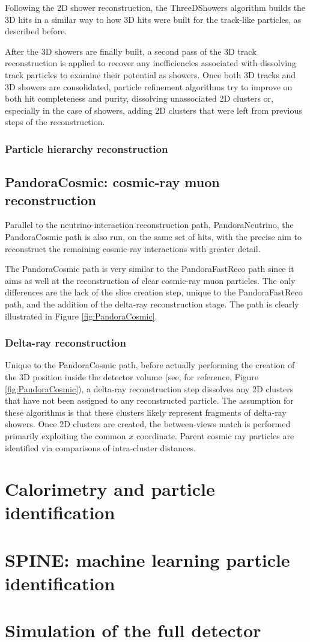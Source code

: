 Following the 2D shower reconstruction, the ThreeDShowers algorithm builds the 3D hits in a similar way to how 3D hits were built for the track-like particles, as described before. 

After the 3D showers are finally built, a second pass of the 3D track reconstruction is applied to recover any inefficiencies associated with dissolving track particles to examine their potential as showers. Once both 3D tracks and 3D showers are consolidated, particle refinement algorithms try to improve on both hit completeness and purity, dissolving unassociated 2D clusters or, especially in the case of showers, adding 2D clusters that were left from previous steps of the reconstruction. 

\subsubsection{Particle hierarchy reconstruction}



\subsection{PandoraCosmic: cosmic-ray muon reconstruction}

Parallel to the neutrino-interaction reconstruction path, PandoraNeutrino, the PandoraCosmic path is also run, on the same set of hits, with the precise aim to reconstruct the remaining cosmic-ray interactions with greater detail. 

The PandoraCosmic path is very similar to the PandoraFastReco path since it aims as well at the reconstruction of clear cosmic-ray muon particles. The only differences are the lack of the slice creation step, unique to the PandoraFastReco path, and the addition of the delta-ray reconstruction stage. The path is clearly illustrated in Figure \ref{fig:PandoraCosmic}. 

\subsubsection{Delta-ray reconstruction}

Unique to the PandoraCosmic path, before actually performing the creation of the 3D position inside the detector volume (see, for reference, Figure \ref{fig:PandoraCosmic}), a delta-ray reconstruction step dissolves any 2D clusters that have not been assigned to any reconstructed particle. The assumption for these algorithms is that these clusters likely represent fragments of delta-ray showers. Once 2D clusters are created, the between-views match is performed primarily exploiting the common $x$ coordinate. Parent cosmic ray particles are identified via comparisons of intra-cluster distances. 

\section{Calorimetry and particle identification}

\section{SPINE: machine learning particle identification} \label{sec:SPINE}

\section{Simulation of the full detector}
